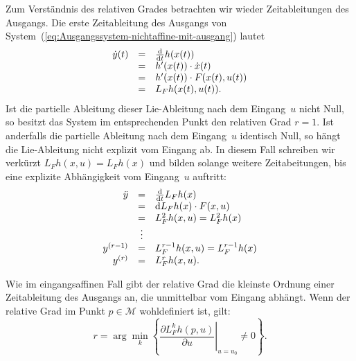 Zum Verständnis des relativen Grades betrachten wir wieder Zeitableitungen
des Ausgangs. Die erste Zeit\-ableitung des Ausgangs von System~(\ref{eq:Ausgangssystem-nichtaffine-mit-ausgang})
lautet
\[
\begin{array}{rcl}
\dot{y}(t) & = & \frac{{\mathrm{d}}}{{\mathrm{d}} t}h(x(t))\\
 & = & h^{\prime}(x(t))\cdot\dot{x}(t)\\
 & = & h^{\prime}(x(t))\cdot F(x(t),u(t))\\
 & = & L_{F}h(x(t),u(t)).
\end{array}
\]
Ist die partielle Ableitung dieser Lie-Ableitung nach dem Eingang~$u$
nicht Null, so besitzt das System im entsprechenden Punkt den relativen
Grad $r=1$. Ist anderfalls die partielle Ableitung nach dem Eingang~$u$
identisch Null, so hängt die Lie-Ableitung nicht explizit vom Eingang
ab. In diesem Fall schreiben wir verkürzt $L_{F}h(x,u)=L_{F}h(x)$
und bilden solange weitere Zeitabeitungen, bis eine explizite Abhängigkeit
vom Eingang~$u$ auftritt:
\[
\begin{array}{rcl}
\ddot{y} & = & \frac{{\mathrm{d}}}{{\mathrm{d}} t}L_{F}h(x)\\
 & = & {\mathrm{d}} L_{F}h(x)\cdot F(x,u)\\
 & = & L_{F}^{2}h(x,u)=L_{F}^{2}h(x)\\
 & \vdots\\
y^{(r-1)} & = & L_{F}^{r-1}h(x,u)=L_{F}^{r-1}h(x)\\
y^{(r)} & = & L_{F}^{r}h(x,u).
\end{array}
\]

Wie im eingangsaffinen Fall gibt der relative Grad die kleinste Ordnung
einer Zeitableitung des Ausgangs an, die unmittelbar vom Eingang abhängt.
Wenn der relative Grad im Punkt $p\in\mathcal{M}$ wohldefiniert ist,
gilt: 
\[
r=\arg\min_{k}\left\{ \left.\frac{\partial L_{F}^{k}h(p,u)}{\partial u}\right|_{u=u_{0}}\neq0\right\} .
\]

